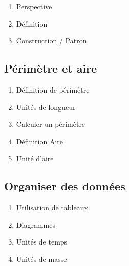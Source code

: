 \begin{enumerate}
	\item Perspective
	\item Définition
	\item Construction / Patron
\end{enumerate}

\subsection{Périmètre et aire}\label{ch_6_peri}

\begin{enumerate}
	\item Définition de périmètre
	\item Unités de longueur
	\item Calculer un périmètre
	\item Définition Aire
	\item Unité d'aire
\end{enumerate}

\subsection{Organiser des données}\label{ch_6_data}

\begin{enumerate}
	\item Utilisation de tableaux
	\item Diagrammes
	\item Unités de temps
	\item Unités de masse	
\end{enumerate}